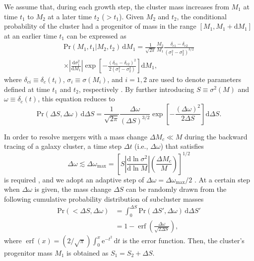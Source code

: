 \documentclass[twocolumn]{aastex62}
\newcommand{\R}[1]{\mathrm{#1}}
\newcommand{\D}[1]{\R{d} #1}
\newcommand{\diff}[2]{\frac{\D{#1}}{\D{#2}}}
\DeclareMathOperator{\erf}{erf}
\begin{document}
We assume that, during each growth step, the cluster mass increases
from $M_1$ at time $t_1$ to $M_2$ at a later time $t_2$ ($> t_1$).
Given $M_2$ and $t_2$, the conditional probability of the cluster had
a progenitor of mass in the range $[M_1, M_1 + \D{M_1}]$ at an earlier
time $t_1$ can be expressed as
\begin{multline}
  \label{eq:eps-condprob}
  \R{Pr}(M_1, t_1 | M_2, t_2) \,\D{M_1} =
    \frac{1}{\sqrt{2\pi}} \frac{M_2}{M_1}
    \frac{\delta_{c1} - \delta_{c2}}{(\sigma_1^2 - \sigma_2^2)^{3/2}} \\
    \times \left| \diff{\sigma_1^2}{M_1} \right|
    \exp \!\left[ -\frac{(\delta_{c1} - \delta_{c2})^2}
      {2(\sigma_1^2 - \sigma_2^2)} \right] \D{M_1},
\end{multline}
where
$\delta_{ci} \equiv \delta_c(t_i)$, $\sigma_i \equiv \sigma(M_i)$, and
$i = 1, 2$ are used to denote parameters defined at time $t_1$ and $t_2$,
respectively \citep{lacey1993,randall2002}.
By further introducing $S \equiv \sigma^2(M)$ and
$\omega \equiv \delta_c(t)$, this equation reduces to
\begin{equation}
  \label{eq:eps-condprob-simp}
  \R{Pr}(\Delta S, \Delta \omega) \,\D{\Delta S} = \frac{1}{\sqrt{2\pi}}
  \frac{\Delta\omega}{(\Delta S)^{3/2}}
  \exp \!\left[ -\frac{(\Delta\omega)^2}{2 \Delta S} \right] \D{\Delta S}.
\end{equation}

In order to resolve mergers with a mass change $\Delta M_c \ll M$
during the backward tracing of a galaxy cluster, a time step $\Delta t$
(i.e., $\Delta\omega$) that satisfies
\begin{equation}
  \label{sec:dw-step}
  \Delta\omega \lesssim \Delta\omega_{\R{max}} = \left[
    S \left| \diff{\ln \sigma^2}{\ln M} \right|
    \left( \frac{\Delta M_c}{M} \right) \right]^{1/2}
\end{equation}
is required \citep{lacey1993}, and we adopt an adaptive step of
$\Delta\omega = \Delta\omega_{\R{max}} / 2$ \citep{randall2002}.
At a certain step when $\Delta\omega$ is given, the mass change
$\Delta S$ can be randomly drawn from the following cumulative
probability distribution of subcluster masses
\begin{align}
  \label{sec:cdf-sub-masses}
  \R{Pr}(<\!\Delta S, \Delta\omega)
    & = \int_0^{\Delta S} \R{Pr}(\Delta S', \Delta\omega) \,\D{\Delta S'} \\
    & = 1 - \erf \!\left( \frac{\Delta \omega}{\sqrt{2 \Delta S}} \right),
\end{align}
where
$\erf(x) = (2/\!\sqrt{\pi}) \int_0^x \R{e}^{-t^2} \,\D{t}$
is the error function.
Then, the cluster's progenitor mass $M_1$ is obtained as
$S_1 = S_2 + \Delta S$.
\end{document}

